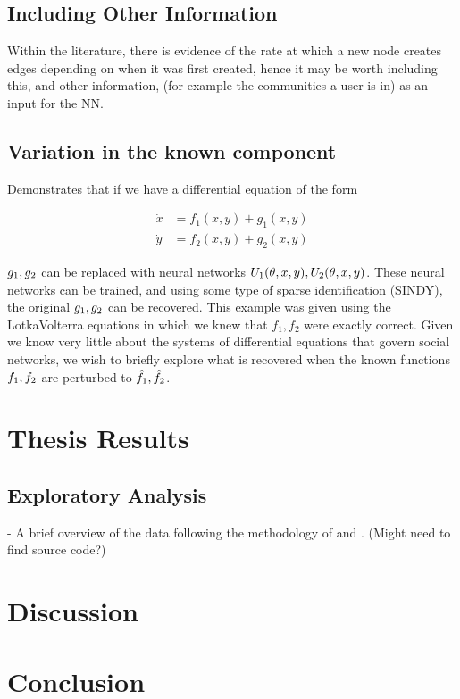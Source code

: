 \documentclass[12pt]{article}
\begin{document}
    \subsection{Including Other Information}
        Within the literature, there is evidence of the rate at which a new node creates edges depending on when it was first created, hence it may be worth including this, and other information, (for example the communities a user is in) as an input for the NN.
    \subsection{Variation in the known component}
        \cite{SciML_C_Rak} Demonstrates that if we have a differential equation of the form
        
        \begin{align}
            \dot x &= f_1(x,y)+g_1(x,y) \\
            \dot y &= f_2(x,y)+g_2(x,y)
        \end{align}
        
        ${g_1, \space g_2}$ can be replaced with neural networks $U_1(\theta, x, y), \space U_2(\theta, x, y)$. These neural networks can be trained, and using some type of sparse identification (SINDY), the original $g_1, \space g_2$ can be recovered. This example was given using the Lotka\-Volterra equations in which we knew that $f_1, f_2$ were exactly correct. Given we know very little about the systems of differential equations that govern social networks, we wish to briefly explore what is recovered when the known functions $f_1, \space f_2$ are perturbed to $\hat f_1, \space \hat f_2$. 
\section{Thesis Results}
\subsection{Exploratory Analysis}
- A brief overview of the data following the methodology of \cite{zhao2012multi} and \cite{garg2009evolution}. (Might need to find source code?)
\section{Discussion}

\section{Conclusion}

\printbibliography
\end{document}
